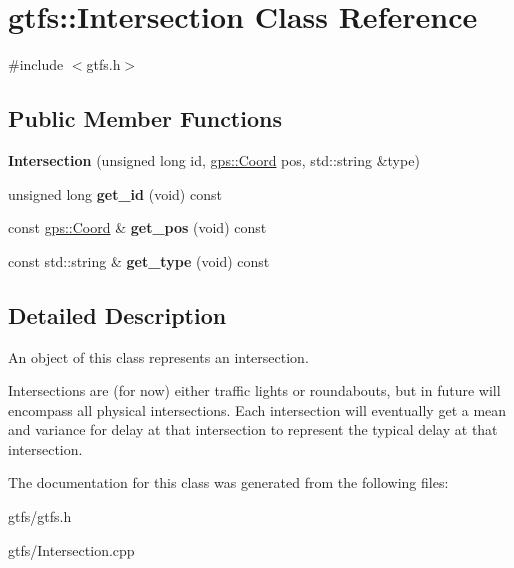 \hypertarget{classgtfs_1_1Intersection}{}\section{gtfs\+:\+:Intersection Class Reference}
\label{classgtfs_1_1Intersection}


{\ttfamily \#include $<$gtfs.\+h$>$}

\subsection*{Public Member Functions}
\begin{DoxyCompactItemize}
\item 
{\bfseries Intersection} (unsigned long id, \hyperlink{classgps_1_1Coord}{gps\+::\+Coord} pos, std\+::string \&type)\hypertarget{classgtfs_1_1Intersection_aebd20bc7b35c2efd04790946b0f70018}{}\label{classgtfs_1_1Intersection_aebd20bc7b35c2efd04790946b0f70018}

\item 
unsigned long {\bfseries get\+\_\+id} (void) const \hypertarget{classgtfs_1_1Intersection_afb4b76414f5184316d43eae31554acfa}{}\label{classgtfs_1_1Intersection_afb4b76414f5184316d43eae31554acfa}

\item 
const \hyperlink{classgps_1_1Coord}{gps\+::\+Coord} \& {\bfseries get\+\_\+pos} (void) const \hypertarget{classgtfs_1_1Intersection_a46d0c0759059b26c015b212e271e13a3}{}\label{classgtfs_1_1Intersection_a46d0c0759059b26c015b212e271e13a3}

\item 
const std\+::string \& {\bfseries get\+\_\+type} (void) const \hypertarget{classgtfs_1_1Intersection_ab4cc0368193c8d5ea996957239fe658d}{}\label{classgtfs_1_1Intersection_ab4cc0368193c8d5ea996957239fe658d}

\end{DoxyCompactItemize}


\subsection{Detailed Description}
An object of this class represents an intersection.

Intersections are (for now) either traffic lights or roundabouts, but in future will encompass all physical intersections. Each intersection will eventually get a mean and variance for delay at that intersection to represent the typical delay at that intersection. 

The documentation for this class was generated from the following files\+:\begin{DoxyCompactItemize}
\item 
gtfs/gtfs.\+h\item 
gtfs/Intersection.\+cpp\end{DoxyCompactItemize}
